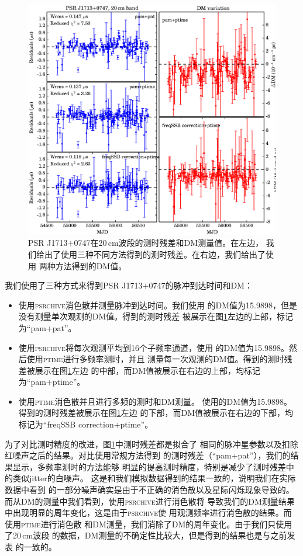 \begin{figure}
\center
\includegraphics[width=4.5 in]{1713.ps}
\caption{PSR J1713$+$0747在20\,cm波段的测时残差和DM测量值。在左边，
我们给出了使用三种不同方法得到的测时残差。在右边，我们给出了使用
两种方法得到的DM值。
}
\label{1713resi}
\end{figure}

我们使用了三种方式来得到PSR J1713$+$0747的脉冲到达时间和DM：
\begin{itemize}
\item 使用\textsc{psrchive}消色散并测量脉冲到达时间。我们使用
的DM值为15.9898，但是没有测量单次观测的DM值。得到的测时残差
被展示在图\ref{1713resi}左边的上部，标记为“pam+pat”。
\item 使用\textsc{psrchive}将每次观测平均到16个子频率通道，使用
的DM值为15.9898。然后使用\textsc{ptime}进行多频率测时，并且
测量每一次观测的DM值。得到的测时残差被展示在图\ref{1713resi}左边
的中部，而DM值被展示在右边的上部，均标记为“pam+ptime”。
\item 使用\textsc{ptime}消色散并且进行多频的测时和DM测量。
使用的DM值为15.9898。得到的测时残差被展示在图\ref{1713resi}左边
的下部，而DM值被展示在右边的下部，均标记为“freqSSB correction+ptime”。
\end{itemize}

为了对比测时精度的改进，图\ref{1713resi}中测时残差都是拟合了
相同的脉冲星参数以及扣除红噪声之后的结果。对比使用常规方法得到
的测时残差（“pam+pat”），我们的结果显示，多频率测时的方法能够
明显的提高测时精度，特别是减少了测时残差中的类似jitter的白噪声。
这是和我们模拟数据得到的结果一致的，说明我们在实际数据中看到
的一部分噪声确实是由于不正确的消色散以及星际闪烁现象导致的。
而从DM的测量中我们看到，使用\textsc{psrchive}进行消色散将
导致我们的DM测量结果中出现明显的周年变化，这是由于\textsc{psrchive}使
用观测频率进行消色散的结果。而使用\textsc{ptime}进行消色散
和DM测量，我们消除了DM的周年变化。由于我们只使用了20\,cm波段
的数据，DM测量的不确定性比较大，但是得到的结果也是与之前发表
的一致的。


